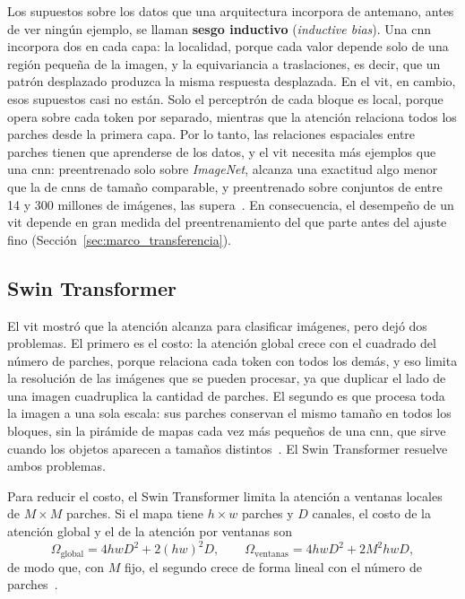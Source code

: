 

Los supuestos sobre los datos que una arquitectura incorpora de antemano, antes de ver ningún ejemplo, se
llaman \textbf{sesgo inductivo} (\emph{inductive bias}). Una \gls{cnn} incorpora dos en cada capa: la localidad,
porque cada valor depende solo de una región pequeña de la imagen, y la equivariancia a traslaciones, es decir,
que un patrón desplazado produzca la misma respuesta desplazada. En el \gls{vit}, en cambio, esos supuestos casi
no están. Solo el perceptrón de cada bloque es local, porque opera sobre cada token por separado, mientras
que la atención relaciona todos los parches desde la primera capa. Por lo tanto, las relaciones espaciales entre
parches tienen que aprenderse de los datos, y el \gls{vit} necesita más ejemplos que una \gls{cnn}: preentrenado
solo sobre \emph{ImageNet}, alcanza una exactitud algo menor que la de \glspl{cnn} de tamaño comparable, y
preentrenado sobre conjuntos de entre 14 y 300 millones de imágenes, las supera~\cite{dosovitskiy2021image}. En
consecuencia, el desempeño de un \gls{vit} depende en gran medida del preentrenamiento del que parte antes del
ajuste fino (Sección~\ref{sec:marco_transferencia}).

\subsection{Swin Transformer}
\label{sec:marco_swin}

El \gls{vit} mostró que la atención alcanza para clasificar imágenes, pero dejó dos problemas. El primero es el
costo: la atención global crece con el cuadrado del número de parches, porque relaciona cada token con todos
los demás, y eso limita la resolución de las imágenes que se pueden procesar, ya que duplicar el lado de una
imagen cuadruplica la cantidad de parches. El segundo es que procesa toda la imagen a una sola escala: sus
parches conservan el mismo tamaño en todos los bloques, sin la pirámide de mapas cada vez más pequeños de una
\gls{cnn}, que sirve cuando los objetos aparecen a tamaños distintos~\cite{liu2021swin}. El Swin Transformer
resuelve ambos problemas.

Para reducir el costo, el Swin Transformer limita la atención a ventanas locales de $M \times M$ parches. Si el
mapa tiene $h \times w$ parches y $D$ canales, el costo de la atención global y el de la atención por ventanas
son
\begin{equation}
    \Omega_{\text{global}} = 4hwD^2 + 2(hw)^2D, \qquad \Omega_{\text{ventanas}} = 4hwD^2 + 2M^2hwD,
    \label{eq:marco_swin_costo}
\end{equation}
de modo que, con $M$ fijo, el segundo crece de forma lineal con el número de parches~\cite{liu2021swin}.

